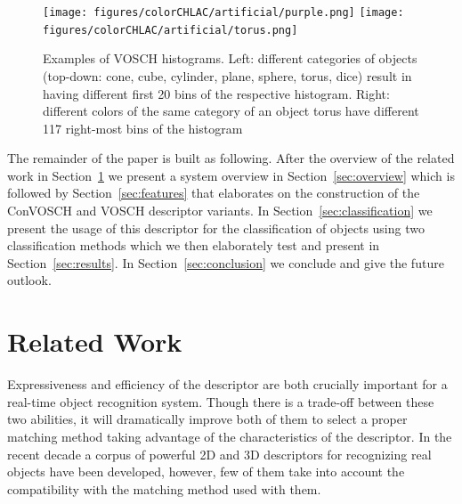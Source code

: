 \documentclass[conference]{sty/IEEEtran}
\begin{document}
\begin{figure}[htb!]
  \begin{center}
    \texttt{[image: figures/colorCHLAC/artificial/purple.png]}
    \texttt{[image: figures/colorCHLAC/artificial/torus.png]}
    \caption{Examples of  VOSCH histograms.
Left: different categories of objects (top-down: cone, cube, cylinder, plane, sphere, torus, dice) 
result in having different first 20 bins of the respective histogram.
Right: different colors of the same category of an object torus have different 117 right-most bins of the histogram}
    \label{fig:grsd_cchlac}
  \end{center}
\end{figure}

The remainder of the paper is built as following. After the overview of the related
work in Section~\ref{sec:rl} we present a system overview in Section~\ref{sec:overview}
which is followed by Section~\ref{sec:features} that elaborates on the construction of the
ConVOSCH and VOSCH descriptor variants. In Section~\ref{sec:classification} we present the usage of this descriptor
for the classification of objects using two classification methods which we
then elaborately test and present in Section~\ref{sec:results}. In Section~\ref{sec:conclusion}
we conclude and give the future outlook.

\section{Related Work}
\label{sec:rl}
Expressiveness and efficiency of the descriptor are both crucially important for
a real-time object recognition system.  Though there is a trade-off between
these two abilities, it will dramatically improve both of them to select a
proper matching method taking advantage of the characteristics of the
descriptor. In the recent decade a corpus of powerful 2D and 3D descriptors for
recognizing real objects have been developed, however, few of them take into
account the compatibility with the matching method used with them.
\end{document}
